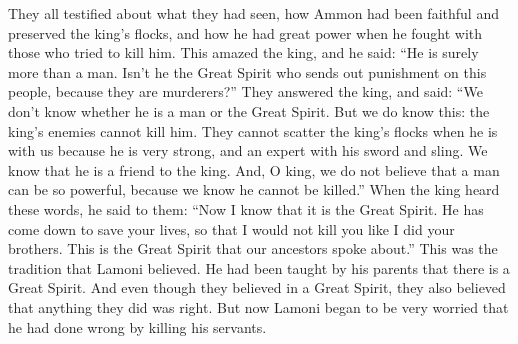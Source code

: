They all testified about what they had seen, how Ammon had been faithful and preserved the king's flocks, and how he had great power when he fought with those who tried to kill him. This amazed the king, and he said: ``He is surely more than a man. Isn't he the Great Spirit who sends out punishment on this people, because they are murderers?''
\bverse \iffalse And they answered the king, and said: Whether he be the Great Spirit or a man, we know not; but this much we do know, that he cannot be slain by the enemies of the king; neither can they scatter the king's flocks when he is with us, because of his expertness and great strength; therefore, we know that he is a friend to the king. And now, O king, we do not believe that a man has such great power, for we know he cannot be slain. \fi
They answered the king, and said: ``We don't know whether he is a man or the Great Spirit. But we do know this: the king's enemies cannot kill him. They cannot scatter the king's flocks when he is with us because he is very strong, and an expert with his sword and sling. We know that he is a friend to the king. And, O king, we do not believe that a man can be so powerful, because we know he cannot be killed.''
\bverse \iffalse And now, when the king heard these words, he said unto them: Now I know that it is the Great Spirit; and he has come down at this time to preserve your lives, that I might not slay you as I did your brethren. Now this is the Great Spirit of whom our fathers have spoken. \fi
When the king heard these words, he said to them: ``Now I know that it is the Great Spirit. He has come down to save your lives, so that I would not kill you like I did your brothers. This is the Great Spirit that our ancestors spoke about.''
\bverse \iffalse Now this was the tradition of Lamoni, which he had received from his father, that there was a Great Spirit. Notwithstanding they believed in a Great Spirit they supposed that whatsoever they did was right; nevertheless, Lamoni began to fear exceedingly, with fear lest he had done wrong in slaying his servants; \fi
This was the tradition that Lamoni believed. He had been taught by his parents that there is a Great Spirit. And even though they believed in a Great Spirit, they also believed that anything they did was right. But now Lamoni began to be very worried that he had done wrong by killing his servants.
\bverse \iffalse For he had slain many of them because their brethren had scattered their flocks at the place of water; and thus, because they had had their flocks scattered they were slain. \fi
